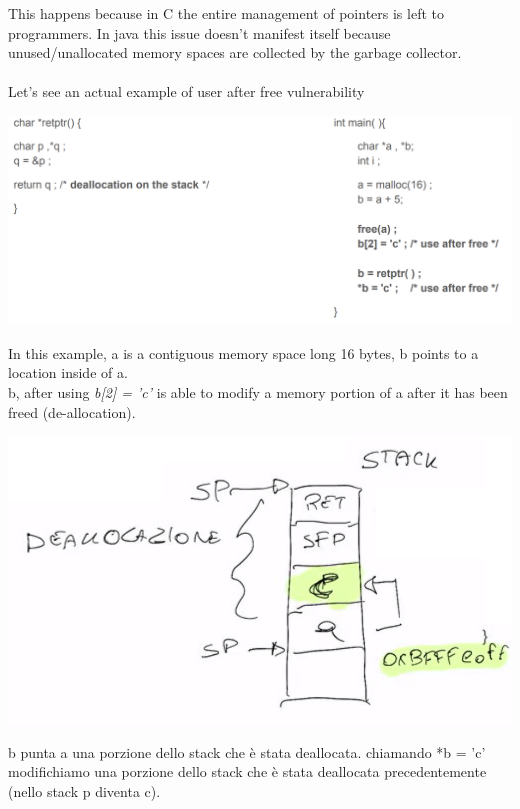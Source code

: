 \documentclass[11pt, oneside]{article}   	%
\begin{document}
This happens because in C the entire management of pointers is left to programmers. In java this issue doesn't manifest itself because unused/unallocated memory spaces are collected by the garbage collector.\\\\
Let's see an actual example of user after free vulnerability
\begin{center}
\includegraphics[scale = 0.6]{usafter}
\end{center}
In this example, a is a contiguous memory space long 16 bytes, b points to a location inside of a.\\
b, after using \emph{b[2] = 'c'} is able to modify a memory portion of a after it has been freed (de-allocation).
\begin{center}
\includegraphics[scale = 0.6]{usafter2}
\end{center}
b punta a una porzione dello stack che è stata deallocata. chiamando *b = 'c' modifichiamo una porzione dello stack che è stata deallocata precedentemente (nello stack p diventa c).
\\\\\\
\end{document}
